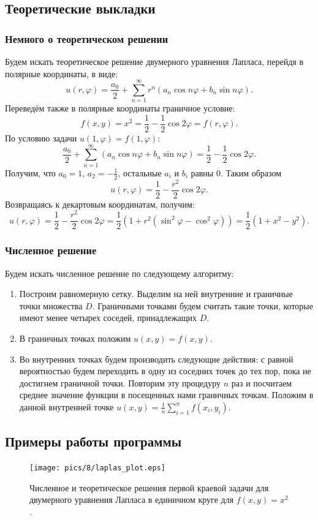\documentclass[11pt]{article}
\begin{document}
\subsection{Теоретические выкладки}
\subsubsection{Немного о теоретическом решении}
Будем искать теоретическое решение двумерного уравнения Лапласа, перейдя в полярные координаты, в виде:
$$
u(r, \varphi) = \frac{a_0}{2} + \sum\limits_{n=1}^{\infty} r^n \left( a_n \cos n\varphi + b_n \sin n\varphi \right).
$$
Переведём также в полярные координаты граничное условие:
$$
f(x, y) = x^2 = \frac{1}{2} - \frac{1}{2} \cos 2\varphi = f(r, \varphi).
$$
По условию задачи $u(1, \varphi) = f(1, \varphi)$:
$$
\frac{a_0}{2} + \sum\limits_{n=1}^{\infty} \left( a_n \cos n\varphi + b_n \sin n\varphi \right) = \frac{1}{2} - \frac{1}{2} \cos 2\varphi.
$$
Получим, что $a_0 = 1$, $a_2 = -\tfrac{1}{2}$, остальные $a_i$ и $b_i$ равны $0$. Таким образом
$$
u(r, \varphi) = \frac{1}{2} - \frac{r^2}{2} \cos 2\varphi.
$$
Возвращаясь к декартовым координатам, получим:
$$
u(r, \varphi) = \frac{1}{2} - \frac{r^2}{2} \cos 2\varphi = \frac{1}{2} \left( 1 + r^2(\sin^2 \varphi - \cos^2 \varphi) \right) = \frac{1}{2} \left( 1 + x^2 - y^2 \right).
$$
\subsubsection{Численное решение}
Будем искать численное решение по следующему алгоритму:
\begin{enumerate}
\item Построим равномерную сетку. Выделим на ней внутренние и граничные точки множества $D$. Граничными точками будем считать такие точки, которые имеют менее четырех соседей, принадлежащих $D$.
\item В граничных точках положим $u(x, y) = f(x, y)$.
\item Во внутренних точках будем производить следующие действия: с равной вероятностью будем переходить в одну из соседних точек до тех пор, пока не достигнем граничной точки. Повторим эту процедуру $n$ раз и посчитаем среднее значение функции в посещенных нами граничных точкам. Положим в данной внутренней точке $u(x, y) = \frac{1}{n} \sum\limits_{i=1}^n f(x_i, y_i)$.
\end{enumerate}
\subsection{Примеры работы программы}
\begin{figure}[h!]
	\centering
	\texttt{[image: pics/8/laplas\_plot.eps]}
	\caption{Численное и теоретическое решения первой краевой задачи для двумерного уравнения Лапласа в
		единичном круге для $f(x, y) = x^2$.}
\end{figure}
\pagebreak
\end{document}

